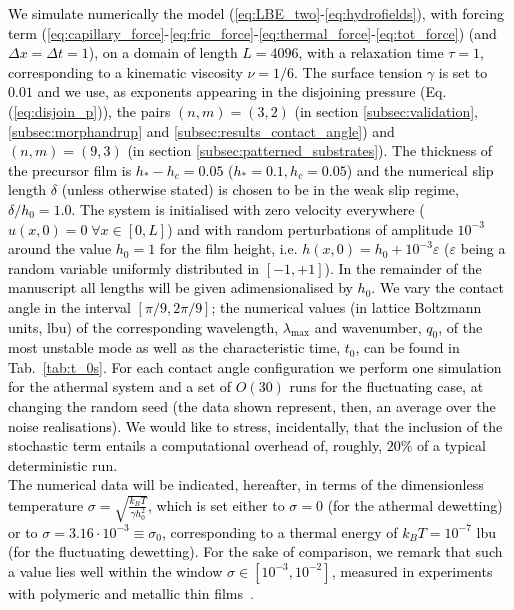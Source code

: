 \textcolor{black}{We simulate numerically the model 
(\ref{eq:LBE_two}-\ref{eq:hydrofields}), with forcing term (\ref{eq:capillary_force}-\ref{eq:fric_force}-\ref{eq:thermal_force}-\ref{eq:tot_force}) (and $\Delta x = \Delta t = 1$), on a domain 
of length $L=4096$,
with a relaxation time $\tau = 1$, corresponding to a kinematic viscosity $\nu = 1/6$.
The surface tension $\gamma$ is set to $0.01$ and we use, as exponents appearing in the disjoining pressure (Eq. (\ref{eq:disjoin_p})),
the pairs $(n,m)=(3,2)$ (in section \ref{subsec:validation}, \ref{subsec:morphandrup} and \ref{subsec:results_contact_angle}) 
and $(n,m)=(9,3)$ (in section \ref{subsec:patterned_substrates}).
The thickness of the precursor film is $h_{\ast}-h_c = 0.05$ ($h_{\ast}=0.1, h_c = 0.05$) and the numerical slip length $\delta$ (unless otherwise stated)
is chosen to be in the weak slip regime, $\delta/h_0 = 1.0$. %
The system is initialised with zero velocity everywhere ($u(x,0)=0 \; \forall x \in [0, L]$)
and with random perturbations of amplitude $10^{-3}$ around the value $h_0 = 1$ for the film height, i.e. 
$h(x,0) = h_0 + 10^{-3} \varepsilon$ ($\varepsilon$ being a random variable uniformly distributed 
in $[-1, +1]$).
In the remainder of the manuscript all lengths will be given adimensionalised by $h_0$.
We vary the contact angle in the interval $[\pi/9, 2\pi/9 ]$;
the numerical values (in lattice Boltzmann units, lbu) of the corresponding wavelength, $\lambda_{\text{max}}$ and wavenumber, $q_0$, of the most unstable mode as well as the characteristic time, $t_0$, can be found in Tab.~\ref{tab:t_0s}.
For each contact angle configuration we perform one simulation for the athermal system and a set 
of $O(30)$ runs for the fluctuating case, at changing the random seed (the data shown represent, then, an average over the noise realisations). We would like to stress, incidentally, that the inclusion of 
the stochastic term entails a computational overhead of, roughly, $20\%$ of a typical deterministic run.\\ 
The numerical data will be indicated, hereafter, in terms of the dimensionless temperature $\sigma = \sqrt{\frac{k_B T}{\gamma h_0^2}}$, which is set either to $\sigma=0$ (for the athermal dewetting) or to $\sigma = 3.16 \cdot 10^{-3} \equiv \sigma_0$, 
corresponding to a thermal energy
of $k_B T = 10^{-7}$ lbu (for the fluctuating dewetting). For the sake of comparison, we remark 
that such a value lies well within the window $\sigma \in [10^{-3}, 10^{-2}]$, measured in experiments with polymeric and metallic thin films~\cite{fetzerThermalNoiseInfluences2007,doi:10.1021/la4009784}}.

